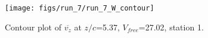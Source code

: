 \begin{figure}[H]
\centering
\texttt{[image: figs/run\_7/run\_7\_W\_contour]}
\caption{Contour plot of $\overline{v_{z}}$ at $z/c$=5.37, $V_{free}$=27.02, station 1.}
\label{fig:run_7_W_contour}
\end{figure}


